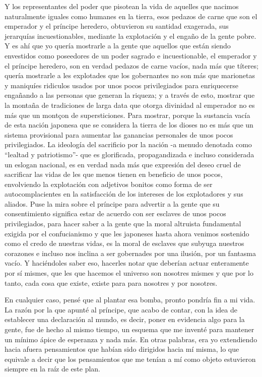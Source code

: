 \documentclass[
]{book}
\begin{document}
Y los representantes del poder que pisotean la vida de aquelles que nacimos naturalmente iguales como humanes en la tierra, esos pedazos de carne que son el emperador y el príncipe heredero, obtuvieron su santidad exagerada, sus jerarquías incuestionables, mediante la explotación y el engaño de la gente pobre. Y es ahí que yo quería mostrarle a la gente que aquellos que están siendo envestidos como poseedores de un poder sagrado e incuestionable, el emperador y el príncipe heredero, son en verdad pedazos de carne vacíos, nada más que títeres; quería mostrarle a les explotades que los gobernantes no son más que marionetas y maniquíes ridiculos usados por unos pocos privilegiados para enriquecerse engañando a las personas que generan la riqueza; y a través de esto, mostrar que la montaña de tradiciones de larga data que otorga divinidad al emperador no es más que un montçon de supersticiones. Para mostrar, porque la sustancia vacía de esta nación japonesa que se considera la tierra de los dioses no es más que un sistema provisional para aumentar las ganancias personales de unos pocos privilegiados. La ideología del sacrificio por la nación -a menudo denotada como ``lealtad y patriotismo''- que es glorificada, propagandizada e incluso considerada un eslogan nacional, es en verdad nada más que expresión del deseo cruel de sacrificar las vidas de les que menos tienen en beneficio de unos pocos, envolviendo la explotación con adjetivos bonitos como forma de ser autocomplacientes en la satisfacción de los intereses de los explotadores y sus aliados. Puse la mira sobre el príncipe para advertir a la gente que su consentimiento significa estar de acuerdo con ser esclaves de unos pocos privilegiados, para hacer saber a la gente que la moral altruista fundamental exigida por el confucianismo y que les japoneses hasta ahora venimos sostenido como el credo de nuestras vidas, es la moral de esclaves que subyuga nuestros corazones e incluso nos inclina a ser gobernades por una ilusión, por un fantasma vacío. Y haciéndoles saber eso, hacerles notar que deberían actuar enteramente por sí mismes, que les que hacemos el universo son nosotres mismes y que por lo tanto, cada cosa que existe, existe para para nosotres y por nosotres.

En cualquier caso, pensé que al plantar esa bomba, pronto pondría fin a mi vida. La razón por la que apunté al príncipe, que acabo de contar, con la idea de establecer una declaración al mundo, es decir, poner en evidencia algo para la gente, fue de hecho al mismo tiempo, un esquema que me inventé para mantener un mínimo ápice de esperanza y nada más. En otras palabras, era yo extendiendo hacia afuera pensamientos que habían sido dirigidos hacia mí misma, lo que equivale a decir que los pensamientos que me tenían a mí como objeto estuvieron siempre en la raíz de este plan.
\end{document}
